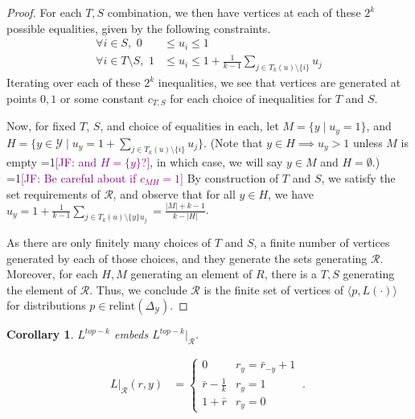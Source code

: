 \documentclass[12pt]{article}
\newcommand{\Comments}{1}
\newcommand{\mynote}[2]{\ifnum\Comments=1\textcolor{#1}{#2}\fi}
\newcommand{\jessie}[1]{\mynote{purple}{[JF: #1]}}
\newcommand{\reals}{\mathbb{R}}
\newcommand{\simplex}{\Delta_\Y}
\newcommand{\R}{\mathcal{R}}
\newcommand{\Y}{\mathcal{Y}}
\newcommand{\inprod}[2]{\langle #1, #2 \rangle}%
\newtheorem{corollary}{Corollary}
\begin{document}
\begin{proof}
	For each $T,S$ combination, we then have vertices at each of these $2^k$ possible equalities, given by the following constraints.
	\begin{align*}
	\forall i \in S, \,\, 0 &\leq u_i \leq 1 \\
	\forall i \in T \setminus S, \,\, 1 &\leq u_i \leq 1 + \frac 1 {k-1} \sum_{j \in T_k(u) \setminus \{i\}} u_j 
	\end{align*}
	Iterating over each of these $2^k$ inequalities, we see that vertices are generated at points $0,1$ or some constant $c_{T,S}$ for each choice of inequalities for $T$ and $S$.

	Now, for fixed $T$, $S$, and choice of equalities in each, let $M = \{y \mid u_y = 1\}$, and $H = \{y \in \Y \mid u_y = 1 + \sum_{j \in T_k(u) \setminus \{i\}} u_j\}$.
	(Note that $y \in H \implies u_y > 1$ unless $M$ is empty \jessie{and $H = \{y\}$?}, in which case, we will say $y \in M$ and $H = \emptyset$.) 
	\jessie{Be careful about if $c_{MH} = 1$}
	By construction of $T$ and $S$, we satisfy the set requirements of $\R$, and observe that for all $y \in H$, we have $u_y = 1 + \frac 1 {k-1}\sum_{j \in T_k(u) \setminus \{y\} u_j} = \frac{|M| + k -1}{k - |H|}$.
	
	As there are only finitely many choices of $T$ and $S$, a finite number of vertices generated by each of those choices, and they generate the sets generating $\R$.
	Moreover, for each $H,M$ generating an element of $R$, there is a $T,S$ generating the element of $\R$.
	Thus, we conclude $\R$ is the finite set of vertices of $\inprod{p}{L(\cdot)}$ for distributions $p \in \mathrm{relint}(\simplex)$.
\end{proof}

\begin{corollary}
	$L^{top-k}$ embeds $L^{top-k}|_\R$.
\end{corollary}

\begin{align}
L|_{\R}(r,y) &= \begin{cases}
0 & r_y = \bar r_{-y} + 1\\
\bar r - \frac 1 k & r_y = 1\\
1 + \bar r & r_y = 0
\end{cases}~.~
\end{align}
\end{document}
